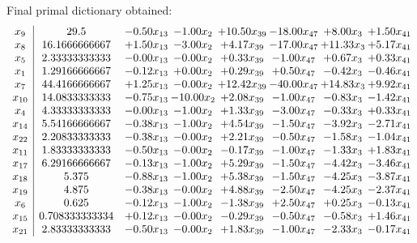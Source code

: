 \documentclass[8pt]{article}
\begin{document}
 Final primal dictionary obtained: 
\[\begin{array}{c| c c@{\hskip 2pt} c@{\hskip 2pt} c@{\hskip 2pt} c@{\hskip 2pt} c@{\hskip 2pt} c@{\hskip 2pt} }
 x_{9}   &  29.5 & -0.50 x_{13} & -1.00 x_{2} & + 10.50 x_{39} & -18.00 x_{47} & +  8.00 x_{3} & +  1.50 x_{41}\\
 x_{8}   &  16.1666666667 & +  1.50 x_{13} & -3.00 x_{2} & +  4.17 x_{39} & -17.00 x_{47} & + 11.33 x_{3} & +  5.17 x_{41}\\
 x_{5}   &  2.33333333333 & -0.00 x_{13} & -0.00 x_{2} & +  0.33 x_{39} & -1.00 x_{47} & +  0.67 x_{3} & +  0.33 x_{41}\\
 x_{1}   &  1.29166666667 & -0.12 x_{13} & +  0.00 x_{2} & +  0.29 x_{39} & +  0.50 x_{47} & -0.42 x_{3} & -0.46 x_{41}\\
 x_{7}   &  44.4166666667 & +  1.25 x_{13} & -0.00 x_{2} & + 12.42 x_{39} & -40.00 x_{47} & + 14.83 x_{3} & +  9.92 x_{41}\\
 x_{10}   &  14.0833333333 & -0.75 x_{13} & -10.00 x_{2} & +  2.08 x_{39} & -1.00 x_{47} & -0.83 x_{3} & -1.42 x_{41}\\
 x_{4}   &  4.33333333333 & -0.00 x_{13} & -1.00 x_{2} & +  1.33 x_{39} & -3.00 x_{47} & -0.33 x_{3} & +  0.33 x_{41}\\
 x_{14}   &  5.54166666667 & -0.38 x_{13} & -1.00 x_{2} & +  4.54 x_{39} & -1.50 x_{47} & -3.92 x_{3} & -2.71 x_{41}\\
 x_{22}   &  2.20833333333 & -0.38 x_{13} & -0.00 x_{2} & +  2.21 x_{39} & -0.50 x_{47} & -1.58 x_{3} & -1.04 x_{41}\\
 x_{11}   &  1.83333333333 & -0.50 x_{13} & -0.00 x_{2} & -0.17 x_{39} & -1.00 x_{47} & -1.33 x_{3} & +  1.83 x_{41}\\
 x_{17}   &  6.29166666667 & -0.13 x_{13} & -1.00 x_{2} & +  5.29 x_{39} & -1.50 x_{47} & -4.42 x_{3} & -3.46 x_{41}\\
 x_{18}   &  5.375 & -0.88 x_{13} & -1.00 x_{2} & +  5.38 x_{39} & -1.50 x_{47} & -4.25 x_{3} & -3.87 x_{41}\\
 x_{19}   &  4.875 & -0.38 x_{13} & -0.00 x_{2} & +  4.88 x_{39} & -2.50 x_{47} & -4.25 x_{3} & -2.37 x_{41}\\
 x_{6}   &  0.625 & -0.12 x_{13} & -1.00 x_{2} & -1.38 x_{39} & +  2.50 x_{47} & +  0.25 x_{3} & -0.13 x_{41}\\
 x_{15}   &  0.708333333334 & +  0.12 x_{13} & -0.00 x_{2} & -0.29 x_{39} & -0.50 x_{47} & -0.58 x_{3} & +  1.46 x_{41}\\
 x_{21}   &  2.83333333333 & -0.50 x_{13} & -0.00 x_{2} & +  1.83 x_{39} & -1.00 x_{47} & -2.33 x_{3} & -0.17 x_{41}\\

\end{array}\]
\end{document}
